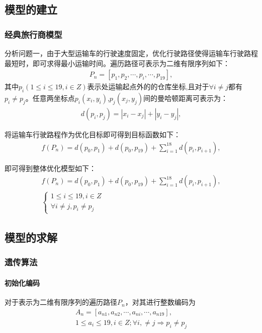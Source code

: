 \documentclass{whutmod}
\begin{document}
   
	    \subsection{模型的建立}
	    \subsubsection{经典旅行商模型}
	    分析问题一，由于大型运输车的行驶速度固定，优化行驶路径使得运输车行驶路程最短时，即可求得最小运输时间。遍历路径可表示为二维有限序列如下：
	     \begin{gather}
	    P_n=[p_{1},p_{2},\cdots,p_{i},\cdots,p_{19}] ,
	    \end{gather}
	    其中$p_{i}(1\leqslant i \leqslant 19 ,i\in Z)$表示处运输起点外的的仓库坐标,且对于$\forall i \neq j$都有$p_i \neq p_j $。任意两坐标点$p_i(x_i,y_i)$,$p_j(x_j,y_j)$间的曼哈顿距离可表示为：
	     \begin{gather*}
	     d(p_i,p_j)=\left | x_i-x_j \right |+\left | y_i-y_j \right | ,
	     \end{gather*}
	     
	    将运输车行驶路程作为优化目标即可得到目标函数如下：
	    \begin{gather*}
	    f(P_n)=d(p_0,p_{1})+d(p_0,p_{19})+\sum_{i=1}^{18}d(p_i,p_{i+1}) ,
	    \end{gather*}
	    
	    即可得到整体优化模型如下：
	    \begin{gather}
	    f(P_n)=d(p_0,p_{1})+d(p_0,p_{19})+\sum_{i=1}^{18}d(p_i,p_{i+1}) ,\\
	    \left\{\begin{matrix}1\leqslant i \leqslant 19 ,i\in Z
	    \\ \forall i \neq j,p_i \neq p_j 
	    \end{matrix}\right.
        \end{gather}
        
        \subsection{模型的求解}
        \subsubsection{遗传算法}
        \paragraph{初始化编码}
        对于表示为二维有限序列的遍历路径$P_n$，对其进行整数编码为
        \begin{gather*}
        A_n=[a_{n1},a_{n2},\cdots,a_{ni},\cdots,a_{n19}], \\
        1\leqslant a_i \leqslant 19 ,i\in Z ;\forall i, \neq j\Rightarrow p_i \neq p_j 
        \end{gather*}
        
\end{document}
